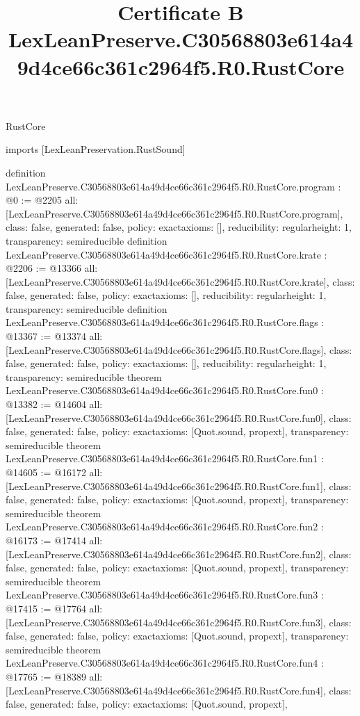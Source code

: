 \begin{lexlean}{RustCore}
\title{Certificate B LexLeanPreserve.C30568803e614a49d4ce66c361c2964f5.R0.RustCore}
\begin{coremodule}
imports [LexLeanPreservation.RustSound]

definition LexLeanPreserve.C30568803e614a49d4ce66c361c2964f5.R0.RustCore.program : @0 := @2205 {
  all: [LexLeanPreserve.C30568803e614a49d4ce66c361c2964f5.R0.RustCore.program],
  class: false,
  generated: false,
  policy: exact{axioms: []},
  reducibility: regular{height: 1},
  transparency: semireducible
}
definition LexLeanPreserve.C30568803e614a49d4ce66c361c2964f5.R0.RustCore.krate : @2206 := @13366 {
  all: [LexLeanPreserve.C30568803e614a49d4ce66c361c2964f5.R0.RustCore.krate],
  class: false,
  generated: false,
  policy: exact{axioms: []},
  reducibility: regular{height: 1},
  transparency: semireducible
}
definition LexLeanPreserve.C30568803e614a49d4ce66c361c2964f5.R0.RustCore.flags : @13367 := @13374 {
  all: [LexLeanPreserve.C30568803e614a49d4ce66c361c2964f5.R0.RustCore.flags],
  class: false,
  generated: false,
  policy: exact{axioms: []},
  reducibility: regular{height: 1},
  transparency: semireducible
}
theorem LexLeanPreserve.C30568803e614a49d4ce66c361c2964f5.R0.RustCore.fun0 : @13382 := @14604 {
  all: [LexLeanPreserve.C30568803e614a49d4ce66c361c2964f5.R0.RustCore.fun0],
  class: false,
  generated: false,
  policy: exact{axioms: [Quot.sound, propext]},
  transparency: semireducible
}
theorem LexLeanPreserve.C30568803e614a49d4ce66c361c2964f5.R0.RustCore.fun1 : @14605 := @16172 {
  all: [LexLeanPreserve.C30568803e614a49d4ce66c361c2964f5.R0.RustCore.fun1],
  class: false,
  generated: false,
  policy: exact{axioms: [Quot.sound, propext]},
  transparency: semireducible
}
theorem LexLeanPreserve.C30568803e614a49d4ce66c361c2964f5.R0.RustCore.fun2 : @16173 := @17414 {
  all: [LexLeanPreserve.C30568803e614a49d4ce66c361c2964f5.R0.RustCore.fun2],
  class: false,
  generated: false,
  policy: exact{axioms: [Quot.sound, propext]},
  transparency: semireducible
}
theorem LexLeanPreserve.C30568803e614a49d4ce66c361c2964f5.R0.RustCore.fun3 : @17415 := @17764 {
  all: [LexLeanPreserve.C30568803e614a49d4ce66c361c2964f5.R0.RustCore.fun3],
  class: false,
  generated: false,
  policy: exact{axioms: [Quot.sound, propext]},
  transparency: semireducible
}
theorem LexLeanPreserve.C30568803e614a49d4ce66c361c2964f5.R0.RustCore.fun4 : @17765 := @18389 {
  all: [LexLeanPreserve.C30568803e614a49d4ce66c361c2964f5.R0.RustCore.fun4],
  class: false,
  generated: false,
  policy: exact{axioms: [Quot.sound, propext]},
}
\end{coremodule}
\end{lexlean}
